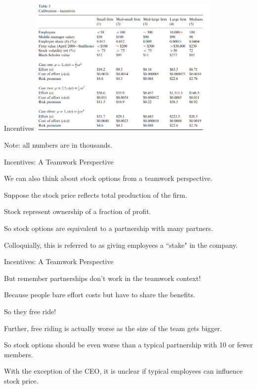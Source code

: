 \documentclass[aspectratio=169,usenames,dvipsnames]{beamer}
\newenvironment{wideitemize}{\itemize\addtolength{\itemsep}{10pt}}{\enditemize}
\begin{document}
\begin{frame}{Incentives}
    \centering\includegraphics[width=0.7\textwidth]{pictures/incentives_stock.png}
    
    Note: all numbers are in thousands.
\end{frame}

\begin{frame}{Incentives: A Teamwork Perspective}

\begin{wideitemize}
    \item We can also think about stock options from a teamwork perspective.
    \item Suppose the stock price reflects total production of the firm.
    \item Stock represent ownership of a fraction of profit.
    \item So stock options are equivalent to a partnership with many partners.
    \item Colloquially, this is referred to as giving employees a ``stake" in the company.
\end{wideitemize}
    
\end{frame}

\begin{frame}{Incentives: A Teamwork Perspective}

\begin{wideitemize}
    \item But remember partnerships don't work in the teamwork context!
    \item Because people bare effort costs but have to share the benefits.
    \item So they free ride!
    \item Further, free riding is actually worse as the size of the team gets bigger.
    \item So stock options should be even worse than a typical partnership with 10 or fewer members.
    \item With the exception of the CEO, it is unclear if typical employees can influence stock price.
\end{wideitemize}
    
\end{frame}
\end{document}
